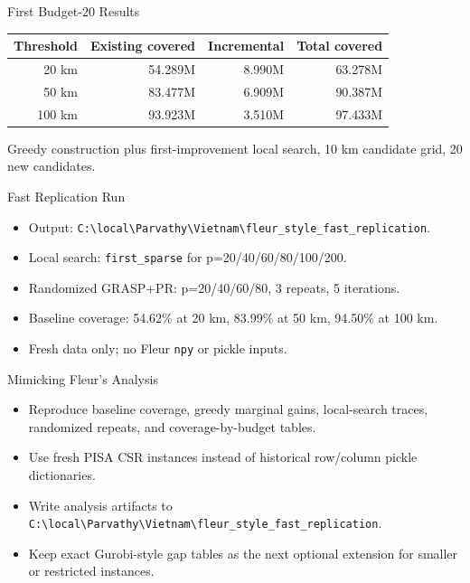 \documentclass[10pt,aspectratio=169]{beamer}
\newcommand{\code}[1]{\texttt{#1}}
\begin{document}
\begin{frame}{First Budget-20 Results}
  \small
  \begin{tabular}{r r r r}
    \toprule
    Threshold & Existing covered & Incremental & Total covered \\
    \midrule
    20 km & 54.289M & 8.990M & 63.278M \\
    50 km & 83.477M & 6.909M & 90.387M \\
    100 km & 93.923M & 3.510M & 97.433M \\
    \bottomrule
  \end{tabular}
  \vspace{0.4cm}

  \small Greedy construction plus first-improvement local search, 10 km candidate grid, 20 new candidates.
\end{frame}
\begin{frame}{Fast Replication Run}
  \small
  \begin{itemize}
    \item Output: \code{C:\textbackslash local\textbackslash Parvathy\textbackslash Vietnam\textbackslash fleur\_style\_fast\_replication}.
    \item Local search: \code{first\_sparse} for p=20/40/60/80/100/200.
    \item Randomized GRASP+PR: p=20/40/60/80, 3 repeats, 5 iterations.
    \item Baseline coverage: 54.62\% at 20 km, 83.99\% at 50 km, 94.50\% at 100 km.
    \item Fresh data only; no Fleur \code{npy} or pickle inputs.
  \end{itemize}
\end{frame}

\begin{frame}{Mimicking Fleur's Analysis}
  \small
  \begin{itemize}
    \item Reproduce baseline coverage, greedy marginal gains, local-search traces, randomized repeats, and coverage-by-budget tables.
    \item Use fresh PISA CSR instances instead of historical row/column pickle dictionaries.
    \item Write analysis artifacts to \code{C:\textbackslash local\textbackslash Parvathy\textbackslash Vietnam\textbackslash fleur\_style\_fast\_replication}.
    \item Keep exact Gurobi-style gap tables as the next optional extension for smaller or restricted instances.
  \end{itemize}
\end{frame}
\end{document}
